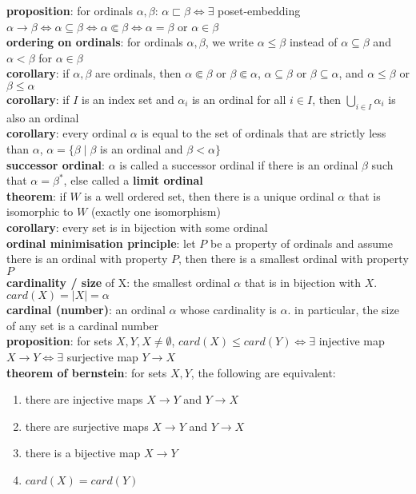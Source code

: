 \documentclass[a4paper]{article}
\begin{document}
\begin{framed}
	\noindent
	\textbf{proposition}: for ordinals $\alpha, \beta$: $\alpha \sqsubset \beta \iff \exists$ poset-embedding $\alpha \rightarrow \beta \iff \alpha \subseteq \beta \iff \alpha \Subset \beta \iff \alpha = \beta$ or $\alpha \in \beta$\\
	\textbf{ordering on ordinals}: for ordinals $\alpha, \beta$, we write $\alpha \leq \beta$ instead of $\alpha \subseteq \beta$ and $\alpha < \beta$ for $\alpha \in \beta$\\
	\textbf{corollary}: if $\alpha, \beta$ are ordinals, then $\alpha \Subset \beta$ or $\beta \Subset \alpha$, $\alpha \subseteq \beta$ or $\beta \subseteq \alpha$, and $\alpha \leq \beta$ or $\beta \leq \alpha$\\
	\textbf{corollary}: if $I$ is an index set and $\alpha_i$ is an ordinal for all $i \in I$, then $\bigcup_{i \in I} \alpha_i$ is also an ordinal\\
	\textbf{corollary}: every ordinal $\alpha$ is equal to the set of ordinals that are strictly less than $\alpha$, $\alpha = \{ \beta \; \vert \; \beta$ is an ordinal and $\beta < \alpha \}$\\
	\textbf{successor ordinal}: $\alpha$ is called a successor ordinal if there is an ordinal $\beta$ such that $\alpha = \beta^*$, else called a \textbf{limit ordinal}\\
	\textbf{theorem}: if $W$ is a well ordered set, then there is a unique ordinal $\alpha$ that is isomorphic to $W$ (exactly one isomorphism)\\
	\textbf{corollary}: every set is in bijection with some ordinal\\
	\textbf{ordinal minimisation principle}: let $P$ be a property of ordinals and assume there is an ordinal with property $P$, then there is a smallest ordinal with property $P$\\
	
	\noindent
	\textbf{cardinality / size} of X: the smallest ordinal $\alpha$ that is in bijection with $X$. $card(X) = \vert X \vert = \alpha$\\
	\textbf{cardinal (number)}: an ordinal $\alpha$ whose cardinality is $\alpha$. in particular, the size of any set is a cardinal number\\
	\textbf{proposition}: for sets $X, Y, X \neq \emptyset$, $card(X) \leq card(Y) \iff \exists$ injective map $X \rightarrow Y \iff \exists$ surjective map $Y \rightarrow X$\\
	\textbf{theorem of bernstein}: for sets $X, Y$, the following are equivalent:
	\begin{enumerate}[label=(\roman*), itemsep=-3pt, topsep=0pt]
		\item there are injective maps $X \rightarrow Y$ and $Y \rightarrow X$
		\item there are surjective maps $X \rightarrow Y$ and $Y \rightarrow X$
		\item there is a bijective map $X \rightarrow Y$
		\item $card(X) = card(Y)$\\
	\end{enumerate}
	

\end{framed}
\end{document}
